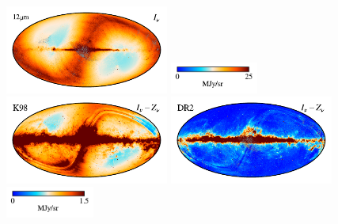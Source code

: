 \documentclass[twocolumn]{aa}
\begin{document}
\begin{figure}
    \includegraphics[height=2.90cm]{figs/compare_freq_maps/cosmoglobe_ma_05.pdf}%
    \includegraphics[width=2.90cm,angle=90]{figs/compare_freq_maps/cbar_tot_05.pdf}%
    \includegraphics[height=2.90cm]{figs/compare_freq_maps/dirbe_zsma_05.pdf}%
    \includegraphics[height=2.90cm]{figs/compare_freq_maps/cosmoglobe_zsma_05.pdf}%
    \includegraphics[width=2.90cm,angle=90]{figs/compare_freq_maps/cbar_05.pdf}%
      \\


\end{figure}
\end{document}
